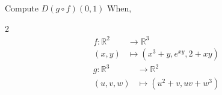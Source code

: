 \documentclass[12pt]{article}
\theoremstyle{definition}
\newtheorem{definition}{Definition}
\newenvironment{problem}[2][Problem]{\begin{trivlist}
    \item[\hskip \labelsep {\bfseries #1}\hskip \labelsep {\bfseries #2.}]}{\end{trivlist}}
\begin{document}

\begin{problem}{1}
    Compute $D(g \circ f)(0,1)$ When,
    \begin{multicols}{2}
        \noindent
        \begin{align}
            f : \mathbb{R}^{2} & \longrightarrow \mathbb{R}^{3} \nonumber \\ 
            (x,y)              & \longmapsto (x^{3}+y,e^{xy},2+xy) \label{eq:1}
        \end{align}
        \begin{align}
            g : \mathbb{R}^{3} & \longrightarrow \mathbb{R}^{2} \nonumber \\
            (u,v,w)            & \longmapsto (u^{2}+v,uv+w^{3})  \label{eq:2}
        \end{align}
    \end{multicols}
\end{problem}
    
\end{document}
